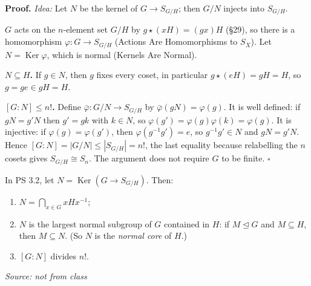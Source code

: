 \documentclass[11pt]{report}
\renewenvironment{proof}[1][Proof]{\noindent\textbf{#1.} }{\hfill$\square$\par\vspace{5pt}}
\newcommand{\srcline}[1]{\par\hfill{\footnotesize\textit{Source: #1}}}
\begin{document}
\begin{proof}
\textit{Idea:} Let $N$ be the kernel of $G \to S_{G/H}$; then $G/N$ injects into $S_{G/H}$.\par
$G$ acts on the $n$-element set $G/H$ by $g \star (xH) = (gx)H$ (\S 29), so there is a homomorphism $\varphi: G \to S_{G/H}$ (Actions Are Homomorphisms to $S_X$). Let $N = \operatorname{Ker}\varphi$, which is normal (Kernels Are Normal).

\textbf{$N \subseteq H$.} If $g \in N$, then $g$ fixes every coset, in particular $g \star (eH) = gH = H$, so $g = ge \in gH = H$.

\textbf{$[G : N] \leq n!$.} Define $\bar\varphi: G/N \to S_{G/H}$ by $\bar\varphi(gN) = \varphi(g)$. It is well defined: if $gN = g'N$ then $g' = gk$ with $k \in N$, so $\varphi(g') = \varphi(g)\varphi(k) = \varphi(g)$. It is injective: if $\varphi(g) = \varphi(g')$, then $\varphi(g^{-1}g') = e$, so $g^{-1}g' \in N$ and $gN = g'N$. Hence $[G : N] = |G/N| \leq |S_{G/H}| = n!$, the last equality because relabelling the $n$ cosets gives $S_{G/H} \cong S_n$.
The argument does not require $G$ to be finite.
\end{proof}

\begin{center}
\label{fig:core}
\end{center}

\begin{propbox}\label{prop:normal-core}
In PS 3.2, let $N = \operatorname{Ker}(G \to S_{G/H})$. Then:
\begin{enumerate}
    \item $N = \bigcap_{x \in G} xHx^{-1}$;
    \item $N$ is the largest normal subgroup of $G$ contained in $H$: if $M \trianglelefteq G$ and $M \subseteq H$, then $M \subseteq N$. (So $N$ is the \emph{normal core} of $H$.)
    \item $[G : N]$ divides $n!$.
\end{enumerate}
\srcline{not from class}
\end{propbox}
\end{document}
